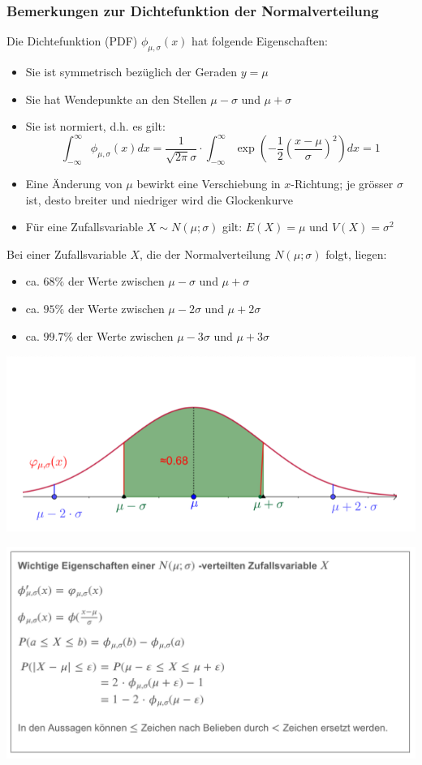 \subsubsection{Bemerkungen zur Dichtefunktion der Normalverteilung}
\label{subsubsec:bemerkungen_dichtefunktion_normalverteilung}
Die Dichtefunktion (PDF) $\phi_{\mu, \sigma}(x)$ hat folgende Eigenschaften:
\begin{itemize}
    \item Sie ist symmetrisch bezüglich der Geraden $y = \mu$
    \item Sie hat Wendepunkte an den Stellen $\mu - \sigma$ und $\mu + \sigma$
    \item Sie ist normiert, d.h. es gilt:
    \begin{equation*}
        \int_{-\infty}^{\infty}\phi_{\mu, \sigma}(x)dx = \frac{1}{\sqrt{2\pi}\sigma} \cdot \int_{-\infty}^{\infty}\exp(-\frac{1}{2}(\frac{x-\mu}{\sigma})^2)dx = 1
    \end{equation*}
    \item Eine Änderung von $\mu$ bewirkt eine Verschiebung in $x$-Richtung; je grösser $\sigma$ ist, desto breiter und niedriger wird die Glockenkurve
    \item Für eine Zufallsvariable $X \sim N(\mu;\sigma)$ gilt: $E(X) = \mu$ und $V(X) = \sigma^2$
\end{itemize}
Bei einer Zufallsvariable $X$, die der Normalverteilung $N(\mu;\sigma)$ folgt, liegen:
\begin{itemize}
    \item ca. $68\%$ der Werte zwischen $\mu - \sigma$ und $\mu + \sigma$
    \item ca. $95\%$ der Werte zwischen $\mu - 2\sigma$ und $\mu + 2\sigma$
    \item ca. $99.7\%$ der Werte zwischen $\mu - 3\sigma$ und $\mu + 3\sigma$
\end{itemize}
\begin{center}
    \includegraphics[width=0.5\linewidth]{images/normalverteilung.png}
\end{center}
\begin{center}
    \includegraphics[width=0.8\linewidth]{images/normalverteilung2.png}
\end{center}
